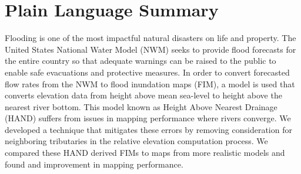 \section*{Plain Language Summary}
Flooding is one of the most impactful natural disasters on life and property.
The United States National Water Model (NWM) seeks to provide flood forecasts for the entire country so that adequate warnings can be raised to the public to enable safe evacuations and protective measures.
In order to convert forecasted flow rates from the NWM to flood inundation maps (FIM), a model is used that converts elevation data from height above mean sea-level to height above the nearest river bottom.
This model known as Height Above Nearest Drainage (HAND) suffers from issues in mapping performance where rivers converge.
We developed a technique that mitigates these errors by removing consideration for neighboring tributaries in the relative elevation computation process.
We compared these HAND derived FIMs to maps from more realistic models and found and improvement in mapping performance.
%
